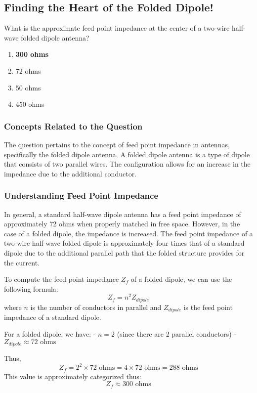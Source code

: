 \subsection{Finding the Heart of the Folded Dipole!}
\begin{tcolorbox}[colback=gray!10, colframe=black, title=E9C07] What is the approximate feed point impedance at the center of a two-wire half-wave folded dipole antenna?
\begin{enumerate}[label=\Alph*.]
    \item \textbf{300 ohms}
    \item 72 ohms
    \item 50 ohms
    \item 450 ohms
\end{enumerate} \end{tcolorbox}

\subsubsection{Concepts Related to the Question}
The question pertains to the concept of feed point impedance in antennas, specifically the folded dipole antenna. A folded dipole antenna is a type of dipole that consists of two parallel wires. The configuration allows for an increase in the impedance due to the additional conductor.

\subsubsection{Understanding Feed Point Impedance}
In general, a standard half-wave dipole antenna has a feed point impedance of approximately 72 ohms when properly matched in free space. However, in the case of a folded dipole, the impedance is increased. The feed point impedance of a two-wire half-wave folded dipole is approximately four times that of a standard dipole due to the additional parallel path that the folded structure provides for the current.

To compute the feed point impedance \(Z_f\) of a folded dipole, we can use the following formula:
\[
Z_f = n^2 Z_{dipole}
\]
where \(n\) is the number of conductors in parallel and \(Z_{dipole}\) is the feed point impedance of a standard dipole.

For a folded dipole, we have:
- \(n = 2\) (since there are 2 parallel conductors)
- \(Z_{dipole} \approx 72 \text{ ohms}\)

Thus,
\[
Z_f = 2^2 \times 72 \text{ ohms} = 4 \times 72 \text{ ohms} = 288 \text{ ohms}
\]
This value is approximately categorized thus:
\[
Z_f \approx 300 \text{ ohms}
\]

